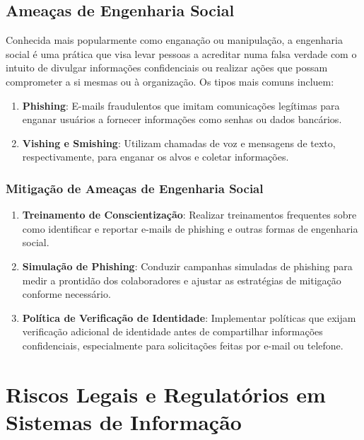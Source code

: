 \documentclass[12pt,oneside,a4paper,article]{abntex2}
\begin{document}
\subsection{Ameaças de Engenharia Social}

Conhecida mais popularmente como enganação ou manipulação, a engenharia social é uma prática que visa levar pessoas a acreditar numa falsa verdade com o intuito de divulgar informações confidenciais ou realizar ações que possam comprometer a si mesmas ou à organização. Os tipos mais comuns incluem:

\begin{enumerate}
    \item \textbf{Phishing}: E-mails fraudulentos que imitam comunicações legítimas para enganar usuários a fornecer informações como senhas ou dados bancários.

    \item \textbf{Vishing e Smishing}: Utilizam chamadas de voz e mensagens de texto, respectivamente, para enganar os alvos e coletar informações.
\end{enumerate}

\subsubsection{Mitigação de Ameaças de Engenharia Social}

\begin{enumerate}
    \item \textbf{Treinamento de Conscientização}: Realizar treinamentos frequentes sobre como identificar e reportar e-mails de phishing e outras formas de engenharia social.

    \item \textbf{Simulação de Phishing}: Conduzir campanhas simuladas de phishing para medir a prontidão dos colaboradores e ajustar as estratégias de mitigação conforme necessário.

    \item \textbf{Política de Verificação de Identidade}: Implementar políticas que exijam verificação adicional de identidade antes de compartilhar informações confidenciais, especialmente para solicitações feitas por e-mail ou telefone.
\end{enumerate}

\newpage

\setcounter{section}{0}
\section{Riscos Legais e Regulatórios em Sistemas de Informação}
\end{document}
